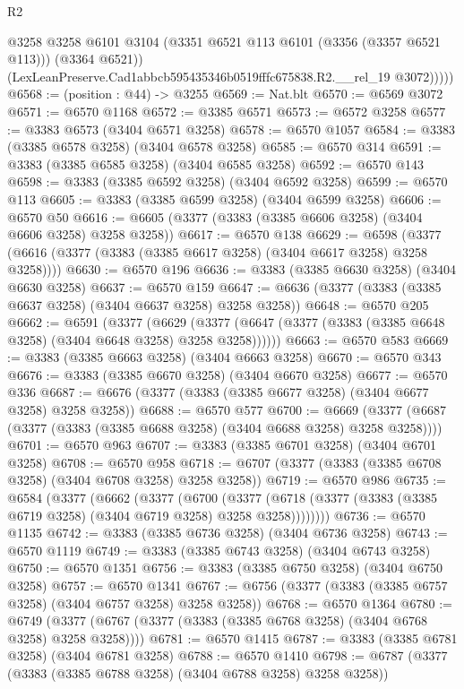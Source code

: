 \begin{lexlean}{R2}
\begin{coremodule}
              @3258
              @3258
              @6101
              @3104
              (@3351 @6521 @113 @6101 (@3356 (@3357 @6521 @113)))
              (@3364 @6521))
            (LexLeanPreserve.Cad1abbcb595435346b0519fffc675838.R2.__rel_19 @3072)))))
@6568 := (position : @44) -> @3255
@6569 := Nat.blt
@6570 := @6569 @3072
@6571 := @6570 @1168
@6572 := @3385 @6571
@6573 := @6572 @3258
@6577 := @3383 @6573 (@3404 @6571 @3258)
@6578 := @6570 @1057
@6584 := @3383 (@3385 @6578 @3258) (@3404 @6578 @3258)
@6585 := @6570 @314
@6591 := @3383 (@3385 @6585 @3258) (@3404 @6585 @3258)
@6592 := @6570 @143
@6598 := @3383 (@3385 @6592 @3258) (@3404 @6592 @3258)
@6599 := @6570 @113
@6605 := @3383 (@3385 @6599 @3258) (@3404 @6599 @3258)
@6606 := @6570 @50
@6616 := @6605 (@3377 (@3383 (@3385 @6606 @3258) (@3404 @6606 @3258) @3258 @3258))
@6617 := @6570 @138
@6629 := @6598 (@3377 (@6616 (@3377 (@3383 (@3385 @6617 @3258) (@3404 @6617 @3258) @3258 @3258))))
@6630 := @6570 @196
@6636 := @3383 (@3385 @6630 @3258) (@3404 @6630 @3258)
@6637 := @6570 @159
@6647 := @6636 (@3377 (@3383 (@3385 @6637 @3258) (@3404 @6637 @3258) @3258 @3258))
@6648 := @6570 @205
@6662 := @6591
    (@3377
      (@6629 (@3377 (@6647 (@3377 (@3383 (@3385 @6648 @3258) (@3404 @6648 @3258) @3258 @3258))))))
@6663 := @6570 @583
@6669 := @3383 (@3385 @6663 @3258) (@3404 @6663 @3258)
@6670 := @6570 @343
@6676 := @3383 (@3385 @6670 @3258) (@3404 @6670 @3258)
@6677 := @6570 @336
@6687 := @6676 (@3377 (@3383 (@3385 @6677 @3258) (@3404 @6677 @3258) @3258 @3258))
@6688 := @6570 @577
@6700 := @6669 (@3377 (@6687 (@3377 (@3383 (@3385 @6688 @3258) (@3404 @6688 @3258) @3258 @3258))))
@6701 := @6570 @963
@6707 := @3383 (@3385 @6701 @3258) (@3404 @6701 @3258)
@6708 := @6570 @958
@6718 := @6707 (@3377 (@3383 (@3385 @6708 @3258) (@3404 @6708 @3258) @3258 @3258))
@6719 := @6570 @986
@6735 := @6584
    (@3377
      (@6662
        (@3377
          (@6700
            (@3377 (@6718 (@3377 (@3383 (@3385 @6719 @3258) (@3404 @6719 @3258) @3258 @3258))))))))
@6736 := @6570 @1135
@6742 := @3383 (@3385 @6736 @3258) (@3404 @6736 @3258)
@6743 := @6570 @1119
@6749 := @3383 (@3385 @6743 @3258) (@3404 @6743 @3258)
@6750 := @6570 @1351
@6756 := @3383 (@3385 @6750 @3258) (@3404 @6750 @3258)
@6757 := @6570 @1341
@6767 := @6756 (@3377 (@3383 (@3385 @6757 @3258) (@3404 @6757 @3258) @3258 @3258))
@6768 := @6570 @1364
@6780 := @6749 (@3377 (@6767 (@3377 (@3383 (@3385 @6768 @3258) (@3404 @6768 @3258) @3258 @3258))))
@6781 := @6570 @1415
@6787 := @3383 (@3385 @6781 @3258) (@3404 @6781 @3258)
@6788 := @6570 @1410
@6798 := @6787 (@3377 (@3383 (@3385 @6788 @3258) (@3404 @6788 @3258) @3258 @3258))

\end{coremodule}
\end{lexlean}
